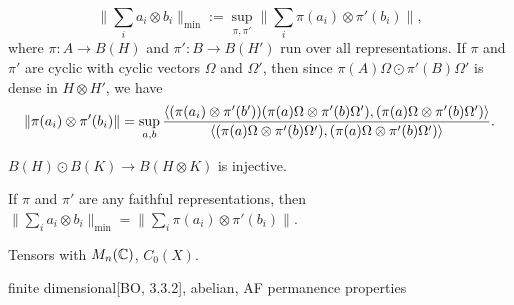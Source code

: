 \documentclass{../../large}
\begin{document}
\begin{prb}
\[\|\sum_ia_i\otimes b_i\|_{\min}:=\sup_{\pi,\pi'}\|\sum_i\pi(a_i)\otimes\pi'(b_i)\|,\]
where $\pi:A\to B(H)$ and $\pi':B\to B(H')$ run over all representations.
If $\pi$ and $\pi'$ are cyclic with cyclic vectors $\Omega$ and $\Omega'$, then since $\pi(A)\Omega\odot\pi'(B)\Omega'$ is dense in $H\otimes H'$, we have
\[\|\pi(a_i)\otimes\pi'(b_i)\|=\sup_{a,b}\frac{\langle(\pi(a_i)\otimes\pi'(b'))(\pi(a)\Omega\otimes\pi'(b)\Omega'),(\pi(a)\Omega\otimes\pi'(b)\Omega')\rangle}{\langle(\pi(a)\Omega\otimes\pi'(b)\Omega'),(\pi(a)\Omega\otimes\pi'(b)\Omega')\rangle}.\]

\begin{parts}
\item $B(H)\odot B(K)\to B(H\otimes K)$ is injective.
\item If $\pi$ and $\pi'$ are any faithful representations, then $\|\sum_ia_i\otimes b_i\|_{\min}=\|\sum_i\pi(a_i)\otimes\pi'(b_i)\|$.
\end{parts}
\end{prb}
\begin{prb}
\end{prb}

Tensors with $M_n(\mathbb{C})$, $C_0(X)$.



finite dimensional[BO, 3.3.2], abelian, AF
permanence properties
\end{document}

